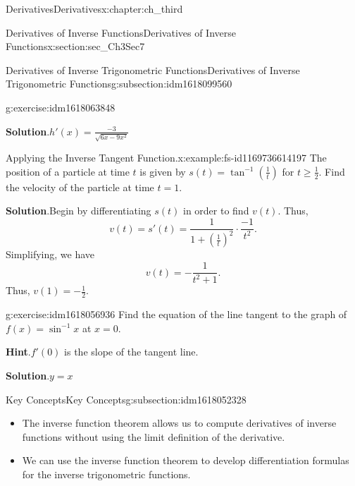 \documentclass[oneside,10pt,]{book}
\newcommand{\blocktitlefont}{\relax}
\numberwithin{equation}{section}
\begin{document}
\begin{chapterptx}{Derivatives}{}{Derivatives}{}{}{x:chapter:ch_third}
\begin{sectionptx}{Derivatives of Inverse Functions}{}{Derivatives of Inverse Functions}{}{}{x:section:sec_Ch3Sec7}
\begin{subsectionptx}{Derivatives of Inverse Trigonometric Functions}{}{Derivatives of Inverse Trigonometric Functions}{}{}{g:subsection:idm1618099560}
\begin{inlineexercise}{}{g:exercise:idm1618063848}
\par\smallskip%
\noindent\textbf{\blocktitlefont Solution}.\hypertarget{g:solution:idm1618058216}{}\quad{}\(h'(x)=\frac{-3}{\sqrt{6x-9x^2}}\)%
\end{inlineexercise}%
\begin{example}{Applying the Inverse Tangent Function.}{x:example:fs-id1169736614197}%
The position of a particle at time \(t\) is given by \(s(t)=\tan^{-1}(\frac{1}{t})\) for \(t\geq \frac{1}{2}.\) Find the velocity of the particle at time \(t=1.\)%
\par\smallskip%
\noindent\textbf{\blocktitlefont Solution}.\hypertarget{g:solution:idm1618058472}{}\quad{}Begin by differentiating \(s(t)\) in order to find \(v(t).\) Thus,%
%
\begin{equation*}
v(t)=s'(t)=\frac{1}{1+(\frac{1}{t})^2}\cdot \frac{-1}{t^2}.
\end{equation*}
Simplifying, we have%
%
\begin{equation*}
v(t)=-\frac{1}{t^2+1}.
\end{equation*}
Thus, \(v(1)=-\frac{1}{2}.\)%
\end{example}
\begin{inlineexercise}{}{g:exercise:idm1618056936}%
Find the equation of the line tangent to the graph of \(f(x)=\sin^{-1}x\) at \(x=0.\)%
\par\smallskip%
\noindent\textbf{\blocktitlefont Hint}.\hypertarget{g:hint:idm1618053480}{}\quad{}\(f'(0)\) is the slope of the tangent line.%
\par\smallskip%
\noindent\textbf{\blocktitlefont Solution}.\hypertarget{g:solution:idm1618052968}{}\quad{}\(y=x\)%
\end{inlineexercise}%
\end{subsectionptx}
%
%
\typeout{************************************************}
\typeout{************************************************}
%
\begin{subsectionptx}{Key Concepts}{}{Key Concepts}{}{}{g:subsection:idm1618052328}
%
\begin{itemize}[label=\textbullet]
\item{}The inverse function theorem allows us to compute derivatives of inverse functions without using the limit definition of the derivative.%
\item{}We can use the inverse function theorem to develop differentiation formulas for the inverse trigonometric functions.%
\end{itemize}
\end{subsectionptx}

\end{sectionptx}
\end{chapterptx}
\end{document}
